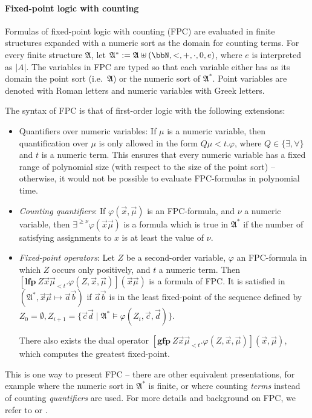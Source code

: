 \documentclass[10pt,a4paper]{article}
\renewcommand{\phi}{\varphi}
\renewcommand{\phi}{\varphi}
\renewcommand{\AA}{{\mathfrak A}}
\begin{document}
	\paragraph*{Fixed-point logic with counting}
	
	Formulas of fixed-point logic with counting (FPC) are evaluated in finite structures expanded with a numeric sort as the domain for counting terms. 
	For every finite structure $\AA$, let $\AA^* := \AA \uplus (\bbN, <, +, \cdot, 0, e)$, where $e$ is interpreted as $|A|$. The variables in FPC are typed so that each variable either has as its domain the point sort (i.e.\ $\AA$) or the numeric sort of $\AA^*$. Point variables are denoted with Roman letters and numeric variables with Greek letters.
	
	The syntax of FPC is that of first-order logic with the following extensions:
	\begin{itemize}
		\item Quantifiers over numeric variables: If $\mu$ is a numeric variable, then quantification over $\mu$ is only allowed in the form $Q \mu < t. \phi$, where $Q \in \{\exists, \forall\}$ and $t$ is a numeric term. This ensures that every numeric variable has a fixed range of polynomial size (with respect to the size of the point sort) -- otherwise, it would not be possible to evaluate FPC-formulas in polynomial time.
		\item \emph{Counting quantifiers}: If $\phi(\vec x, \vec \mu)$ is an FPC-formula, and $\nu$ a numeric variable, then $\exists^{\geq \nu}\phi(\vec x \vec \mu)$ is a formula which is true in $\AA^*$ if the number of satisfying assignments to $x$ is at least the value of $\nu$.
		\item \emph{Fixed-point operators}: Let $Z$ be a second-order variable, $\phi$ an FPC-formula in which $Z$ occurs only positively, and $t$ a numeric term. Then $[\mathbf{lfp}~ Z \vec x \vec \mu_{<t} . \phi(Z, \vec x, \vec \mu)](\vec x \vec \mu)$ is a formula of FPC. It is satisfied in $(\AA^*,\vec x \vec \mu \mapsto \vec a \vec b)$ if $\vec a \vec b$ is in the least fixed-point of the sequence defined by $Z_0 = \emptyset, Z_{i+1} = \{ \vec c \vec d  \mid \AA^* \models  \phi(Z_i, \vec c, \vec d)  \}$.
		
		There also exists the dual operator 
		$[\mathbf{gfp}~ Z \vec x \vec \mu_{<t} . \phi(Z,\vec x, \vec \mu)](\vec x, \vec \mu)$, which computes the greatest fixed-point.
	\end{itemize}	 
	
	This is one way to present FPC -- there are other equivalent presentations, for example where the numeric sort in $\AA^*$ is finite, or where counting \emph{terms} instead of counting \emph{quantifiers} are used. For more details and background on FPC, we refer to \cite{otto1997bounded} or \cite{dawar2015nature}. 
	
\end{document}
